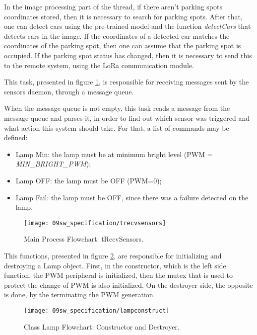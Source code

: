 In the image processing part of the thread, if there aren't parking spots coordinates stored, then it is necessary to search for parking spots. After that, one can detect cars using the pre-trained model and the function \textit{detectCars} that detects cars in the image. If the coordinates of a detected car matches the coordinates of the parking spot, then one can assume that the parking spot is occupied. If the parking spot status has changed, then it is necessary to send this to the remote system, using the LoRa communication module.


This task, presented in figure \ref{fig:flow_trecv_sensors}, is responsible for receiving messages sent by the sensors daemon, through a message queue.

When the message queue is not empty, this task reads a message from the message queue and parses it, in order to find out which sensor was triggered and what action this system should take. For that, a list of commands may be defined:
\begin{itemize}
	\item Lamp Min: the lamp must be at minimum bright level (PWM = \textit{MIN\_BRIGHT\_PWM});
	\item Lamp OFF: the lamp must be OFF (PWM=0);
	\item Lamp Fail: the lamp must be OFF, since there was a failure detected on the lamp.
\end{itemize}

\begin{figure}[H]
	\centering			\texttt{[image: 09sw\_specification/trecvsensors]}
	\caption{Main Process Flowchart: tRecvSensors.}
	\label{fig:flow_trecv_sensors}
\end{figure}

\clearpage
{}

This functions, presented in figure \ref{fig:flow_lampconstruct}, are responsible for initializing and destroying a Lamp object. First, in the constructor, which is the left side function, the PWM peripheral is initialized, then the mutex that is used to protect the change of PWM is also initialized. On the destroyer side, the opposite is done, by the terminating the PWM generation.

\begin{figure}[H]
	\centering	
	\texttt{[image: 09sw\_specification/lampconstruct]}
	\caption{Class Lamp Flowchart: Constructor and Destroyer.}
	\label{fig:flow_lampconstruct}
\end{figure}

